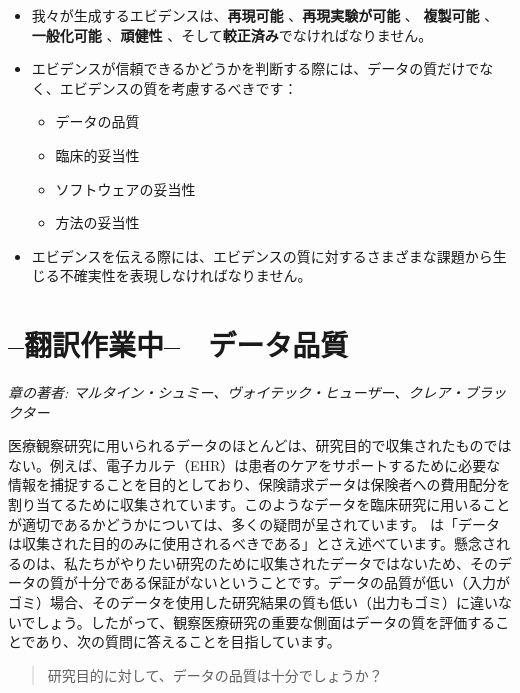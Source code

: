 \documentclass[
  11pt]{book}
\makeatletter
\providecommand{\tightlist}{%
  \setlength{\itemsep}{0pt}\setlength{\parskip}{0pt}}
\newenvironment{kframe}{%
\medskip{}
\setlength{\fboxsep}{.8em}
 \def\at@end@of@kframe{}%
 \ifinner\ifhmode%
  \def\at@end@of@kframe{\end{minipage}}%
  \begin{minipage}{\columnwidth}%
 \fi\fi%
 \def\FrameCommand##1{\hskip\@totalleftmargin \hskip-\fboxsep
 \colorbox{myShadeColor}{##1}\hskip-\fboxsep
     \hskip-\linewidth \hskip-\@totalleftmargin \hskip\columnwidth}%
 \MakeFramed {\advance\hsize-\width
   \@totalleftmargin\z@ \linewidth\hsize
   \@setminipage}}%
 {\par\unskip\endMakeFramed%
 \at@end@of@kframe}
\newenvironment{rmdblock}[1]
  {
  \begin{itemize}
  \renewcommand{\labelitemi}{
    \raisebox{-.7\height}[0pt][0pt]{
      {\setkeys{Gin}{width=3em,keepaspectratio}\texttt{[image: images/\#1]}}
    }
  }
  \setlength{\fboxsep}{1em}
  \begin{kframe}
  \item
  }
  {
  \end{kframe}
  \end{itemize}
  }
\newenvironment{rmdsummary}
  {\begin{rmdblock}{summary}}
  {\end{rmdblock}}
\theoremstyle{definition}
\theoremstyle{definition}
\theoremstyle{definition}
\theoremstyle{definition}
\theoremstyle{remark}
\makeatother
\begin{document}
\begin{rmdsummary}
\begin{itemize}
\item
  我々が生成するエビデンスは、\textbf{再現可能} 、\textbf{再現実験が可能} 、 \textbf{複製可能} 、\textbf{一般化可能} 、\textbf{頑健性} 、そして\textbf{較正済み}でなければなりません。
\item
  エビデンスが信頼できるかどうかを判断する際には、データの質だけでなく、エビデンスの質を考慮するべきです：

  \begin{itemize}
  \tightlist
  \item
    データの品質
  \item
    臨床的妥当性
  \item
    ソフトウェアの妥当性
  \item
    方法の妥当性
  \end{itemize}
\item
  エビデンスを伝える際には、エビデンスの質に対するさまざまな課題から生じる不確実性を表現しなければなりません。
\end{itemize}
\end{rmdsummary}

\chapter{--翻訳作業中--　データ品質}\label{DataQuality}

\emph{章の著者: マルタイン・シュミー、ヴォイテック・ヒューザー、クレア・ブラックター}

医療観察研究に用いられるデータのほとんどは、研究目的で収集されたものではない。例えば、電子カルテ（EHR）は患者のケアをサポートするために必要な情報を捕捉することを目的としており、保険請求データは保険者への費用配分を割り当てるために収集されています。このようなデータを臨床研究に用いることが適切であるかどうかについては、多くの疑問が呈されています。\citet{vanDerLei_1991} は「データは収集された目的のみに使用されるべきである」とさえ述べています。懸念されるのは、私たちがやりたい研究のために収集されたデータではないため、そのデータの質が十分である保証がないということです。データの品質が低い（入力がゴミ）場合、そのデータを使用した研究結果の質も低い（出力もゴミ）に違いないでしょう。したがって、観察医療研究の重要な側面はデータの質を評価することであり、次の質問に答えることを目指しています。

\begin{quote}
研究目的に対して、データの品質は十分でしょうか？
\end{quote}
\end{document}
